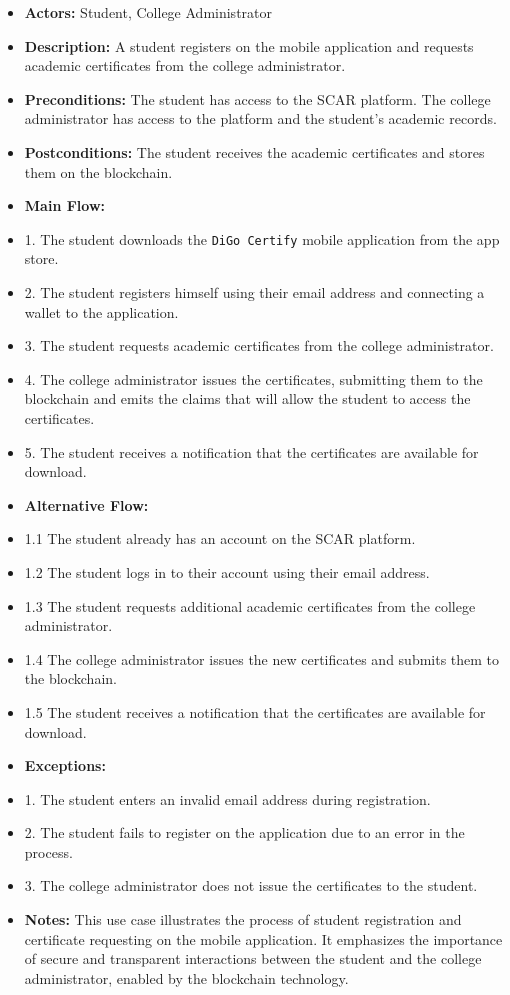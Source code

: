 \begin{itemize}

    \item \textbf{Actors:} Student, College Administrator
    \item \textbf{Description:} A student registers on the mobile application and requests academic certificates from the college administrator.
    \item \textbf{Preconditions:} The student has access to the SCAR platform. The college administrator has access to the platform and the student's academic records.
    \item \textbf{Postconditions:} The student receives the academic certificates and stores them on the blockchain.
    \item \textbf{Main Flow:}
    \item 1. The student downloads the \texttt{DiGo Certify} mobile application from the app store.
    \item 2. The student registers himself using their email address and connecting a wallet to the application.
    \item 3. The student requests academic certificates from the college administrator.
    \item 4. The college administrator issues the certificates, submitting them to the blockchain and
          emits the claims that will allow the student to access the certificates.
    \item 5. The student receives a notification that the certificates are available for download.
    \item \textbf{Alternative Flow:}
    \item 1.1 The student already has an account on the SCAR platform.
    \item 1.2 The student logs in to their account using their email address.
    \item 1.3 The student requests additional academic certificates from the college administrator.
    \item 1.4 The college administrator issues the new certificates and submits them to the blockchain.
    \item 1.5 The student receives a notification that the certificates are available for download.
    \item \textbf{Exceptions:}
    \item 1. The student enters an invalid email address during registration.
    \item 2. The student fails to register on the application due to an error in the process.
    \item 3. The college administrator does not issue the certificates to the student.
    \item \textbf{Notes:} This use case illustrates the process of student registration and certificate requesting on the mobile application. It emphasizes the importance of secure and transparent interactions between the student and the college administrator, enabled by the blockchain technology.
\end{itemize}

